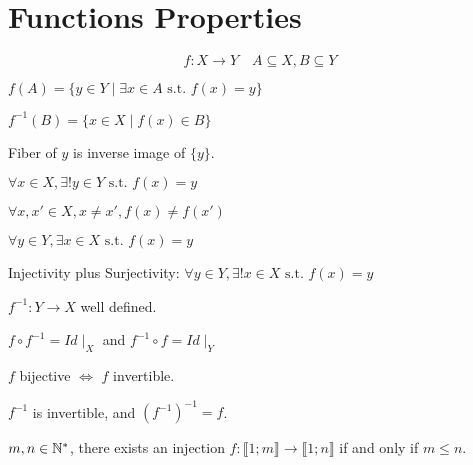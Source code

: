\chapter{Functions Properties}
$$f: X \to Y \quad A \subseteq X, B \subseteq Y$$
\begin{definition}[Image]
	$f(A) = \{ y \in Y \mid \exists x \in A \text{ s.t. } f(x)=y \}$
\end{definition}
\begin{definition}
	$f^{-1}(B) = \{ x \in X \mid f(x) \in B \}$
\end{definition}
\begin{definition}[Fiber]
	Fiber of $y$ is inverse image of $\{y\}$.
\end{definition}
\begin{definition}
	$\forall x \in X, \exists ! y \in Y \text{ s.t. } f(x) = y$\\
\end{definition}
\begin{definition}[Injectivity]
	$\forall x,x' \in X, x \neq x', f(x) \neq f(x')$
\end{definition}
\begin{definition}[Surjectivity]
	$\forall y \in Y, \exists x \in X \text{ s.t. } f(x) = y$
\end{definition}
\begin{definition}[Bijectivity]
	Injectivity plus Surjectivity:
	$\forall y \in Y, \exists! x \in X \text{ s.t. } f(x) = y$
\end{definition}
\begin{definition}[Invertibility]
	$f^{-1}: Y \to X$ well defined.
\end{definition}
\begin{remark}
	$f \circ f^{-1} = Id \mid_X$  and $f^{-1} \circ f = Id \mid_Y$
\end{remark}
\begin{remark}
	$f$ bijective $\iff$ $f$ invertible.
\end{remark}
\begin{remark}
	$f^{-1}$ is invertible, and $(f^{-1})^{-1}=f$.
\end{remark}
\begin{property}
	$m,n \in \mathbb{N}^*$, there exists an injection $f:\llbracket 1;m \rrbracket \rightarrow \llbracket 1;n \rrbracket$ if and only if $m\leq n$.
\end{property}
